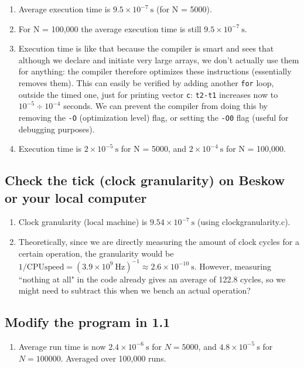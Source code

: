 \documentclass[a4paper]{article}
\begin{document}
\begin{enumerate}
    \setlength\itemsep{0.01em}
    \item Average execution time is $9.5 \times 10^{-7} \ \text{s}$ (for N = 5000).
    \item For N = 100,000 the average execution time is still $9.5 \times 10^{-7} \ \text{s}$.
    \item Execution time is like that because the compiler is smart and sees that although we declare and initiate very large arrays, we don't actually use them for anything: the compiler therefore optimizes these instructions (essentially removes them). This can easily be verified by adding another \texttt{for} loop, outside the timed one, just for printing vector \texttt{c}: \texttt{t2-t1} increases now to $10^{-5}\div10^{-4}$ seconds. We can prevent the compiler from doing this by removing the \texttt{-O} (optimization level) flag, or setting the \texttt{-O0} flag (useful for debugging purposes).
    \item Execution time is $2 \times 10^{-5} \ \text{s}$ for N = 5000, and $2 \times 10^{-4} \ \text{s}$ for N = 100,000.
\end{enumerate}

\subsection{Check the tick (clock granularity) on Beskow or your local computer}

\begin{enumerate}
    \setlength\itemsep{0.01em}
    \item Clock granularity (local machine) is $9.54 \times 10^{-7} \ \text{s}$ (using clockgranularity.c).
    \item Theoretically, since we are directly measuring the amount of clock cycles for a certain operation, the granularity would be $1/\text{CPUspeed} = (3.9 \times 10^9 \ \text{Hz})^{-1} \approx 2.6\times 10^{-10} \ \text{s}$. However, measuring ``nothing at all" in the code already gives an average of 122.8 cycles, so we might need to subtract this when we bench an actual operation?
\end{enumerate}

\subsection{Modify the program in 1.1}

\begin{enumerate}
    \setlength\itemsep{0.01em}
    \item Average run time is now $2.4 \times 10^{-6} \ \text{s}$ for $N = 5000$, and $4.8 \times 10^{-5} \ \text{s}$ for $N = 100000$. Averaged over 100,000 runs.
\end{enumerate}
\end{document}
